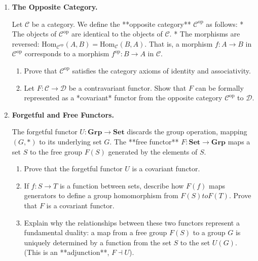 \documentclass[12pt, a4paper]{article}
\begin{document}
\begin{enumerate}[label=\textbf{P\arabic*.}]
  \item \textbf{The Opposite Category.}
  
        Let $\mathcal{C}$ be a category. We define the **opposite category** $\mathcal{C}^{\text{op}}$ as follows:
        * The objects of $\mathcal{C}^{\text{op}}$ are identical to the objects of $\mathcal{C}$.
        * The morphisms are reversed: $\text{Hom}_{\mathcal{C}^{\text{op}}}(A, B) = \text{Hom}_{\mathcal{C}}(B, A)$. That is, a morphism $f: A \to B$ in $\mathcal{C}^{\text{op}}$ corresponds to a morphism $f^{\text{op}}: B \to A$ in $\mathcal{C}$.
        
        \begin{enumerate}[label=(\alph*)]
          \item Prove that $\mathcal{C}^{\text{op}}$ satisfies the category axioms of identity and associativity.
          \item Let $F: \mathcal{C} \to \mathcal{D}$ be a contravariant functor.
                Show that $F$ can be formally represented as a *covariant* functor from the opposite category $\mathcal{C}^{\text{op}}$ to $\mathcal{D}$.
        \end{enumerate}

  \item \textbf{Forgetful and Free Functors.}
  
        The forgetful functor $U: \mathbf{Grp} \to \mathbf{Set}$ discards the group operation, mapping $(G, *)$ to its underlying set $G$.
        The **free functor** $F: \mathbf{Set} \to \mathbf{Grp}$ maps a set $S$ to the free group $F(S)$ generated by the elements of $S$.
        \begin{enumerate}[label=(\alph*)]
          \item Prove that the forgetful functor $U$ is a covariant functor.
          \item If $f: S \to T$ is a function between sets, describe how $F(f)$ maps generators to define a group homomorphism from $F(S) to F(T)$. Prove that $F$ is a covariant functor.
          \item Explain why the relationships between these two functors represent a fundamental duality: a map from a free group $F(S)$ to a group $G$ is uniquely determined by a function from the set $S$ to the set $U(G)$. (This is an **adjunction**, $F \dashv U$).
        \end{enumerate}
\end{enumerate}
\end{document}
